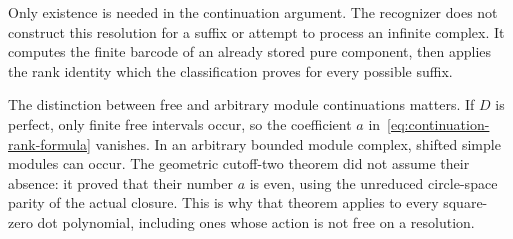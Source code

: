 Only existence is needed in the continuation argument. The recognizer
does not construct this resolution for a suffix or attempt to process
an infinite complex. It computes the finite barcode of an already
stored pure component, then applies the rank identity which the
classification proves for every possible suffix.

The distinction between free and arbitrary module continuations matters.
If $D$ is perfect, only finite free intervals occur, so the coefficient
$a$ in~\eqref{eq:continuation-rank-formula} vanishes. In an arbitrary
bounded module complex, shifted simple modules can occur. The geometric
cutoff-two theorem did not assume their absence: it proved that their
number $a$ is even, using the unreduced circle-space parity of the
actual closure. This is why that theorem applies to every square-zero
dot polynomial, including ones whose action is not free on a resolution.
